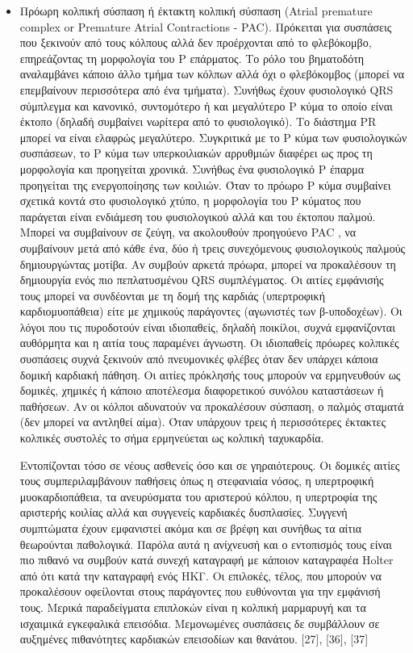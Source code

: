 \begin{itemize}
	\item Πρόωρη κολπική σύσπαση ή έκτακτη κολπική σύσπαση \en (Atrial premature complex or Premature Atrial Contractions - PAC). \gr  Πρόκειται για συσπάσεις που ξεκινούν από τους κόλπους αλλά δεν προέρχονται από το φλεβόκομβο, επηρεάζοντας τη μορφολογία του Ρ επάρματος. Το ρόλο του βηματοδότη αναλαμβάνει κάποιο άλλο τμήμα των κόλπων αλλά όχι ο φλεβόκομβος (μπορεί να επεμβαίνουν περισσότερα από ένα τμήματα). Συνήθως έχουν φυσιολογικό \en QRS \gr σύμπλεγμα και κανονικό, συντομότερο ή και μεγαλύτερο Ρ κύμα το οποίο είναι έκτοπο (δηλαδή συμβαίνει νωρίτερα από το φυσιολογικό). Το διάστημα \en PR \gr μπορεί να είναι ελαφρώς μεγαλύτερο. Συγκριτικά με το Ρ κύμα των φυσιολογικών συσπάσεων, το Ρ κύμα των υπερκοιλιακών αρρυθμιών διαφέρει ως προς τη μορφολογία και προηγείται χρονικά. Συνήθως ένα φυσιολογικό Ρ έπαρμα προηγείται της ενεργοποίησης των κοιλιών. Όταν το πρόωρο Ρ κύμα συμβαίνει σχετικά κοντά στο φυσιολογικό χτύπο, η μορφολογία του Ρ κύματος που παράγεται είναι ενδιάμεση του φυσιολογικού αλλά και του έκτοπου παλμού. Μπορεί να συμβαίνουν σε ζεύγη, να ακολουθούν προηγούενο \en PAC \gr, να συμβαίνουν μετά από κάθε ένα, δύο ή τρεις συνεχόμενους φυσιολογικούς παλμούς δημιουργώντας μοτίβα. Αν συμβούν αρκετά πρόωρα, μπορεί να προκαλέσουν τη δημιουργία ενός πιο πεπλατυσμένου \en QRS \gr συμπλέγματος. Οι αιτίες εμφάνισής τους μπορεί να συνδέονται με τη δομή της καρδιάς (υπερτροφική καρδιομυοπάθεια) είτε με χημικούς παράγοντες (αγωνιστές των β-υποδοχέων). Οι λόγοι που τις πυροδοτούν είναι ιδιοπαθείς, δηλαδή ποικίλοι, συχνά εμφανίζονται αυθόρμητα και η αιτία τους παραμένει άγνωστη. Οι ιδιοπαθείς πρόωρες κολπικές συσπάσεις συχνά ξεκινούν από πνευμονικές φλέβες όταν δεν υπάρχει κάποια δομική καρδιακή πάθηση. Οι αιτίες πρόκλησής τους μπορούν να ερμηνευθούν ως δομικές, χημικές ή κάποιο αποτέλεσμα διαφορετικού συνόλου καταστάσεων ή παθήσεων. Αν οι κόλποι αδυνατούν να προκαλέσουν σύσπαση, ο παλμός σταματά (δεν μπορεί να αντληθεί αίμα). Όταν υπάρχουν τρεις ή περισσότερες έκτακτες κολπικές συστολές το σήμα ερμηνεύεται ως κολπική ταχυκαρδία.
	\par
	Εντοπίζονται τόσο σε νέους ασθενείς όσο και σε γηραιότερους. Οι δομικές αιτίες τους συμπεριλαμβάνουν παθήσεις όπως η στεφανιαία νόσος, η υπερτροφική μυοκαρδιοπάθεια, τα ανευρύσματα του αριστερού κόλπου, η υπερτροφία της αριστερής κοιλίας αλλά και συγγενείς καρδιακές δυσπλασίες. Συγγενή συμπτώματα έχουν εμφανιστεί ακόμα και σε βρέφη και συνήθως τα αίτια θεωρούνται παθολογικά. Παρόλα αυτά η ανίχνευσή και ο εντοπισμός τους είναι πιο πιθανό να συμβούν κατά συνεχή καταγραφή με κάποιον καταγραφέα \en Holter \gr από ότι κατά την καταγραφή ενός ΗΚΓ. Οι επιλοκές, τέλος, που μπορούν να προκαλέσουν οφείλονται στους παράγοντες που ευθύνονται για την εμφάνισή τους. Μερικά παραδείγματα επιπλοκών είναι η κολπική μαρμαρυγή και τα ισχαιμικά εγκεφαλικά επεισόδια. Μεμονωμένες συσπάσεις δε συμβάλλουν σε αυξημένες πιθανότητες καρδιακών επεισοδίων και θανάτου. [27], [36], [37] \en
\end{itemize}
